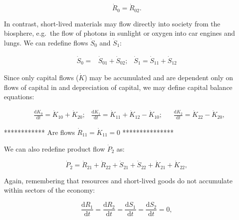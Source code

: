 \begin{equation}
	\dot{R}_{0} = \dot{R}_{02}.
\end{equation}

In contrast, short-lived materials may flow directly into society from the biosphere, 
e.g.\ the flow of photons in sunlight or oxygen into car engines and lungs. 
We can redefine flows $\dot{S}_{0}$ and $\dot{S}_{1}$:

\begin{align}\label{eq:B_S_def}
	\dot{S}_{0} = 
	& \dot{S}_{01} + \dot{S}_{02};
	& \dot{S}_{1} = 
	\dot{S}_{11} + \dot{S}_{12}
\end{align}

Since only capital flows ($\dot{K}$) may be accumulated and are dependent only on flows of 
capital in and depreciation of capital, we may define capital balance equations:

\begin{align}\label{eq:B_K_def}
	& \frac{\mathrm{d}K_{0}}{\mathrm{d}t}
	= \dot{K}_{10}
	+ \dot{K}_{20};
	& \frac{\mathrm{d}K_{1}}{\mathrm{d}t}
 	= \dot{K}_{11}
	+ \dot{K}_{12}
	- \dot{K}_{10};							&
	& \frac{\mathrm{d}K_{2}}{\mathrm{d}t} =
	\dot{K}_{22} 
	- \dot{K}_{20},
\end{align}

************ Are flows $\dot{R}_{11} = \dot{K}_{11} = 0$ ***************




We can also redefine product flow $\dot{P}_{2}$ as:

\begin{equation} \label{eq:B_P_def}
	\dot{P}_{2}
	= \dot{R}_{21}
	+ \dot{R}_{22}
	+ \dot{S}_{21}
	+ \dot{S}_{22}
	+ \dot{K}_{21}	 
	+ \dot{K}_{22},
\end{equation}


\noindent Again, remembering that resources and short-lived
goods do not accumulate within sectors of the economy:

\begin{equation}\label{eq:dR_and_dS_zero}
	\frac{\mathrm{d}R_{1}}{\mathrm{d}t}
	= \frac{\mathrm{d}R_{2}}{\mathrm{d}t} 
	= \frac{\mathrm{d}S_{1}}{\mathrm{d}t} 
	= \frac{\mathrm{d}S_{2}}{\mathrm{d}t} 
	= 0,
\end{equation}

